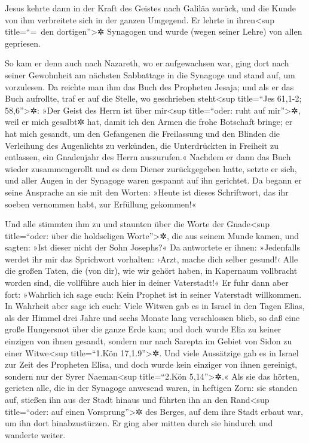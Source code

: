  Jesus kehrte dann in der Kraft des Geistes nach Galiläa
zurück, und die Kunde von ihm verbreitete sich in der ganzen Umgegend.
 Er lehrte in ihren\textless sup title=``=~den
dortigen''\textgreater✲ Synagogen und wurde (wegen seiner Lehre) von
allen gepriesen.

 So kam er denn auch nach Nazareth, wo er aufgewachsen
war, ging dort nach seiner Gewohnheit am nächsten Sabbattage in die
Synagoge und stand auf, um vorzulesen.  Da reichte man
ihm das Buch des Propheten Jesaja; und als er das Buch aufrollte, traf
er auf die Stelle, wo geschrieben steht\textless sup title=``Jes 61,1-2;
58,6''\textgreater✲:  »Der Geist des Herrn ist über
mir\textless sup title=``oder: ruht auf mir''\textgreater✲, weil er mich
gesalbt✲ hat, damit ich den Armen die frohe Botschaft bringe; er hat
mich gesandt, um den Gefangenen die Freilassung und den Blinden die
Verleihung des Augenlichts zu verkünden, die Unterdrückten in Freiheit
zu entlassen,  ein Gnadenjahr des Herrn auszurufen.«
 Nachdem er dann das Buch wieder zusammengerollt und es
dem Diener zurückgegeben hatte, setzte er sich, und aller Augen in der
Synagoge waren gespannt auf ihn gerichtet.  Da begann er
seine Ansprache an sie mit den Worten: »Heute ist dieses Schriftwort,
das ihr soeben vernommen habt, zur Erfüllung gekommen!«

 Und alle stimmten ihm zu und staunten über die Worte der
Gnade\textless sup title=``oder: über die holdseligen
Worte''\textgreater✲, die aus seinem Munde kamen, und sagten: »Ist
dieser nicht der Sohn Josephs?«  Da antwortete er ihnen:
»Jedenfalls werdet ihr mir das Sprichwort vorhalten: ›Arzt, mache dich
selber gesund!‹ Alle die großen Taten, die (von dir), wie wir gehört
haben, in Kapernaum vollbracht worden sind, die vollführe auch hier in
deiner Vaterstadt!«  Er fuhr dann aber fort: »Wahrlich
ich sage euch: Kein Prophet ist in seiner Vaterstadt willkommen.
 In Wahrheit aber sage ich euch: Viele Witwen gab es in
Israel in den Tagen Elias, als der Himmel drei Jahre und sechs Monate
lang verschlossen blieb, so daß eine große Hungersnot über die ganze
Erde kam;  und doch wurde Elia zu keiner einzigen von
ihnen gesandt, sondern nur nach Sarepta im Gebiet von Sidon zu einer
Witwe\textless sup title=``1.Kön 17,1.9''\textgreater✲. 
Und viele Aussätzige gab es in Israel zur Zeit des Propheten Elisa, und
doch wurde kein einziger von ihnen gereinigt, sondern nur der Syrer
Naeman\textless sup title=``2.Kön 5,14''\textgreater✲.« 
Als sie das hörten, gerieten alle, die in der Synagoge anwesend waren,
in heftigen Zorn:  sie standen auf, stießen ihn aus der
Stadt hinaus und führten ihn an den Rand\textless sup title=``oder: auf
einen Vorsprung''\textgreater✲ des Berges, auf dem ihre Stadt erbaut
war, um ihn dort hinabzustürzen.  Er ging aber mitten
durch sie hindurch und wanderte weiter.

